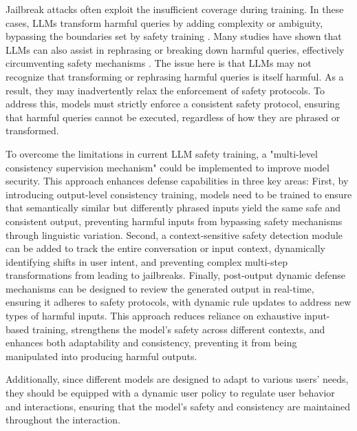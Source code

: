 Jailbreak attacks often exploit the insufficient coverage during training. In these cases, LLMs transform harmful queries by adding complexity or ambiguity, bypassing the boundaries set by safety training \cite{jailbreak20queries, shah2023scalable, gong2023figstep, ma2024visual}. Many studies have shown that LLMs can also assist in rephrasing or breaking down harmful queries, effectively circumventing safety mechanisms \cite{huang2024obscurepromptjailbreakinglargelanguage, chang2024play}. The issue here is that LLMs may not recognize that transforming or rephrasing harmful queries is itself harmful. As a result, they may inadvertently relax the enforcement of safety protocols. To address this, models must strictly enforce a consistent safety protocol, ensuring that harmful queries cannot be executed, regardless of how they are phrased or transformed.

To overcome the limitations in current LLM safety training, a "multi-level consistency supervision mechanism" could be implemented to improve model security. This approach enhances defense capabilities in three key areas: First, by introducing output-level consistency training, models need to be trained to ensure that semantically similar but differently phrased inputs yield the same safe and consistent output, preventing harmful inputs from bypassing safety mechanisms through linguistic variation. Second, a context-sensitive safety detection module can be added to track the entire conversation or input context, dynamically identifying shifts in user intent, and preventing complex multi-step transformations from leading to jailbreaks. Finally, post-output dynamic defense mechanisms can be designed to review the generated output in real-time, ensuring it adheres to safety protocols, with dynamic rule updates to address new types of harmful inputs. This approach reduces reliance on exhaustive input-based training, strengthens the model’s safety across different contexts, and enhances both adaptability and consistency, preventing it from being manipulated into producing harmful outputs.

Additionally, since different models are designed to adapt to various users' needs, they should be equipped with a dynamic user policy to regulate user behavior and interactions, ensuring that the model's safety and consistency are maintained throughout the interaction.


